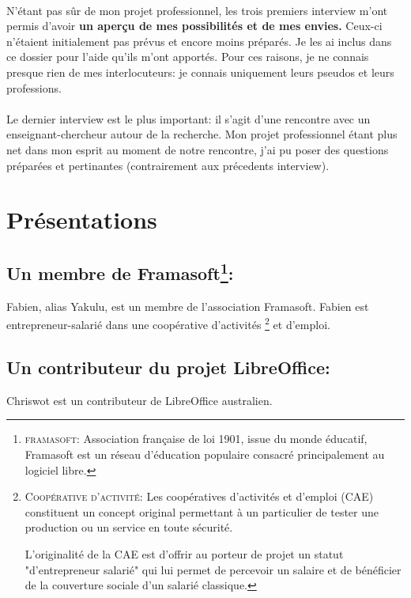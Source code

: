 \documentclass[a4paper,12pt, draft]{report}
\begin{document}
\paragraph{}
N'étant pas sûr de mon projet professionnel, les trois premiers interview m'ont permis d'avoir \textbf{un aperçu de mes possibilités et de mes envies.} Ceux-ci n'étaient initialement pas prévus et encore moins préparés. Je les ai inclus dans ce dossier pour l'aide qu'ils m'ont apportés.
Pour ces raisons, je ne connais presque rien de mes interlocuteurs: je connais uniquement leurs pseudos et leurs professions.

\paragraph{}
Le dernier interview est le plus important: il s'agit d'une rencontre avec un enseignant-chercheur autour de la recherche. Mon projet professionnel étant plus net dans mon esprit au moment de notre rencontre, j'ai pu poser des questions préparées et pertinantes (contrairement aux précedents interview).



\section{Présentations}
\subsection[Un membre de framasoft]{Un membre de Framasoft\footnote{\textsc{framasoft}: Association française de loi 1901, issue du monde éducatif, Framasoft est un réseau d'éducation populaire consacré principalement au logiciel libre. }: }
Fabien, alias Yakulu, est un membre de l'association Framasoft. Fabien est entrepreneur-salarié dans une coopérative d'activités \footnote{\textsc{Coopérative d'activité}: Les coopératives d'activités et d'emploi (CAE) constituent un concept original permettant à un particulier de tester une production ou un service en toute sécurité.

L'originalité de la CAE est d'offrir au porteur de projet un statut "d'entrepreneur salarié" qui lui permet de percevoir un salaire et de bénéficier de la couverture sociale d'un salarié classique.} et d'emploi.

\subsection[Un contributeur du projet LibreOffice]{Un contributeur du projet LibreOffice: }
Chriswot est un contributeur de LibreOffice australien.
\end{document}
